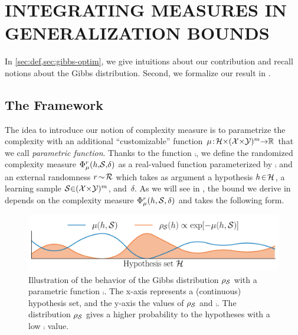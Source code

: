 \documentclass[twoside]{article}
\theoremstyle{plain}
\begin{document}
\section{INTEGRATING MEASURES IN GENERALIZATION BOUNDS}
\label{sec:contrib} 

In \cref{sec:def,sec:gibbs-optim}, we give intuitions about our contribution and recall notions about the Gibbs distribution.
Second, we formalize our result in .

\subsection{The Framework}
\label{sec:def}
The idea to introduce our notion of complexity measure is to parametrize the complexity with an additional ``customizable'' function $\operatorname{\mu}\!:\! \mathcal{H}{\times}(\mathcal{X}{\times}\mathcal{Y})^m {\to} \mathbb{R}$ that we call \textit{parametric function}. 
Thanks to the function $\comp$, we define the randomized complexity measure $\Phi_{\operatorname{\mu}}^{r}(h{,}\mathcal{S}{,}\delta)$ as a real-valued function parameterized by $\comp$ and an external randomness $r\!\sim\!\mathcal{R}$ which takes as argument a hypothesis $h\!\in\!\mathcal{H}$, a learning sample $\mathcal{S}{\in}(\mathcal{X}{\times}\mathcal{Y})^m$, \mbox{and $\delta$}.
As we will see in , the bound we derive in  depends on the complexity measure $\Phi_{\operatorname{\mu}}^{r}(h, \mathcal{S}, \delta)$ and takes the following form.

\begin{figure}
\includegraphics[width=1.0\linewidth]{figures/fig_1.pdf}
\caption{\label{fig:gibbs}
 Illustration of the behavior of the Gibbs distribution $\rho_{\mathcal{S}}$ with a parametric function $\comp$. 
 The x-axis represents a (continuous) hypothesis set, and the y-axis the values of $\rho_{\mathcal{S}}$ and $\comp$.
 The distribution $\rho_{\mathcal{S}}$ gives a higher probability to the hypotheses with a low $\comp$ value.
}
\end{figure}
\end{document}
